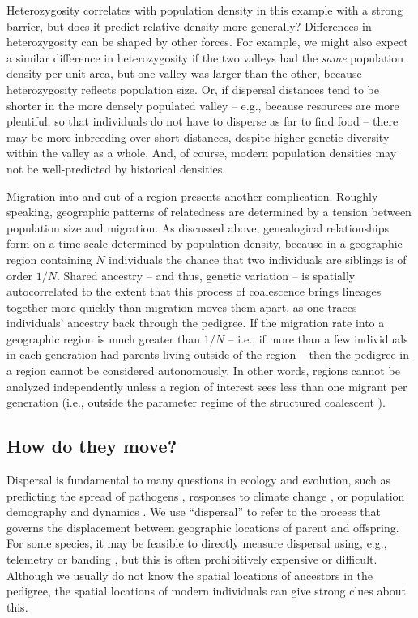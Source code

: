 \documentclass{ar-1col}
\renewcommand{\emph}[1]{{\textit{#1}}}
\begin{document}
Heterozygosity correlates with population density in this example with a strong barrier,
but does it predict relative density more generally?
Differences in heterozygosity can be shaped by other forces.
For example, we might also expect a similar difference in heterozygosity
if the two valleys had the \emph{same} population density per unit area,
but one valley was larger than the other,
because heterozygosity reflects population size.
Or, if dispersal distances tend to be shorter
in the more densely populated valley -- 
e.g., because resources are more plentiful, 
so that individuals do not have to disperse as far to find food -- 
there may be more inbreeding over short distances,
despite higher genetic diversity within the valley as a whole.
And, of course, modern population densities may not be well-predicted by historical densities.

Migration into and out of a region presents another complication.
Roughly speaking,
geographic patterns of relatedness
are determined by a tension between population size and migration.
As discussed above,
genealogical relationships form on a time scale determined by population density,
because in a geographic region containing $N$ individuals
the chance that two individuals are siblings is of order $1/N$.
Shared ancestry -- and thus, genetic variation -- is spatially autocorrelated
to the extent that this process of coalescence
brings lineages together more quickly than migration moves them apart,
as one traces individuals' ancestry back through the pedigree.
If the migration rate into a geographic region is much greater than $1/N$ --
i.e., if more than a few individuals in each generation had parents living outside of the region --
then the pedigree in a region cannot be considered autonomously.
In other words,
regions cannot be analyzed independently
unless a region of interest sees less than one migrant per generation
(i.e., outside the parameter regime of the structured coalescent \citep{nagylaki1998}).


\subsection{How do they move?}

Dispersal is fundamental to many questions in ecology and evolution,
such as
predicting the spread of pathogens \citep{BiekReal2010},
responses to climate change \citep{parmesan2006},
or population demography and dynamics \citep{schreiber2010interactive}.
We use ``dispersal'' to refer to the process that governs 
the displacement between geographic locations of parent and offspring.
For some species,
it may be feasible to directly measure dispersal 
using, e.g., telemetry or banding \citep{Cayuela2018demographic},
but this is often prohibitively expensive or difficult.
Although we usually do not know the spatial locations of ancestors in the pedigree,
the spatial locations of modern individuals can give strong clues about this.
\end{document}
